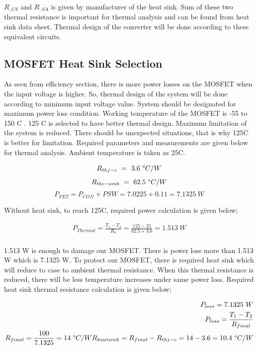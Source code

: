 $R_{,CS}$ and $R_{,SA}$ is  given by manufacturer of the heat sink. Sum of these two thermal resistance is important for thermal analysis and can be found from heat sink data sheet. Thermal design of the converter will be done according to these equivalent circuits.

\subsection{MOSFET Heat Sink Selection}

As seen from efficiency section, there is more power losses on the MOSFET when the input voltage is higher. So, thermal design of the system will be done according to minimum input voltage value. System should be designated for maximum power loss condition. Working temperature of the MOSFET is -55 to 150 \degree C . 125 \degree C is selected to have better thermal design. Maximum limitation of the system is reduced. There should be unexpected situations, that is why 125\degree C is better for limitation. Required parameters and measurements are given below for thermal analysis. Ambient temperature is taken as 25\degree C.

$$R_{thj-c}\ =\ 3.6\ \degree C / W$$
$$R_{thc-amb}\ =\ 62.5\ \degree C / W$$
$$P_{FET} = P_{CON}+P{SW} = 7.0225+0.11 = 7.1325\ W$$

Without heat sink, to reach 125\degree C, required power calculation is given below;

\begin{align}
    P_{Thermal} = \frac{T_1 - T_2}{R_\theta} = \frac{125-25}{62.5+3.6} = 1.513\ W \\
\end{align}

1.513 W is enough to damage our MOSFET. There is power loss more than 1.513 W which is 7.1325 W. To protect our MOSFET, there is required heat sink which will reduce to case to ambient thermal resistance. When this thermal resistance is reduced, there will be less temperature increases under same power loss. Required heat sink thermal resistance calculation is given below;

\begin{align}
    P_{loss} = 7.1325\ W \\
    P_{loss} = \frac{T_1 - T_2 }{R_{final}}\\
    R_{final} = \frac{100}{7.1325} = 14\ \degree C/W
    R_{heat sink} = R_{final} - R_{thj-c} = 14-3.6 = 10.4\ \degree C/W\\
\end{align}

